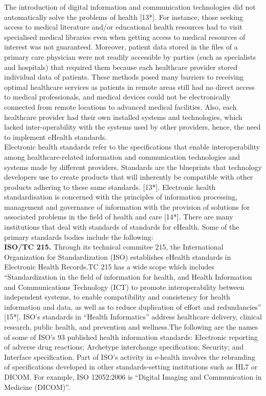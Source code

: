 \documentclass[a4paper]{article}
\begin{document}
The introduction of digital information and communication technologies did not automatically solve the problems of health [13*]. For instance, those seeking access to medical literature and/or educational health resources had to visit specialised medical libraries even when getting access to medical resources of interest was not guaranteed. Moreover, patient data stored in the files of a primary care physician were not readily accessible by parties (such as specialists and hospitals) that required them because each healthcare provider stored individual data of patients. These methods posed many barriers to receiving optimal healthcare services as patients in remote areas still had no direct access to medical professionals, and medical devices could not be electronically connected from remote locations to advanced medical facilities. Also, each healthcare provider had their own installed systems and technologies, which lacked inter-operability with the systems used by other providers, hence, the need to implement eHealth standards. \\Electronic health standards refer to the specifications that enable interoperability among healthcare-related information and communication technologies and systems made by different providers. Standards are the blueprints that technology developers use to create products that will inherently be compatible with other products adhering to these same standards.  [13*]. Electronic health standardisation is concerned with the principles of information processing, management and governance of information with the provision of solutions for associated problems in the field of health and care [14*]. There are many institutions that deal with standards of standards for eHealth. Some of the primary standards bodies include the following: \\
{\bf ISO/TC 215.} Through its technical commitee 215, the International Organization for Standardization (ISO) establishes eHealth standards in Electronic Health Records.TC 215 has a wide scope which includes “Standardization in the field
of information for health, and Health Information and Communications Technology (ICT) to promote interoperability
between independent systems, to enable compatibility and consistency for health information and data, as well as to reduce duplication of effort and redundancies” [15*]. ISO’s standards in
“Health Informatics” address healthcare delivery, clinical research, public health, and prevention and wellness.The following are the names of some of ISO’s 93 published health information standards: Electronic reporting of adverse drug reactions; Archetype interchange specification; Security; and Interface specification. Part of ISO’s activity in e-health involves the rebranding of specifications developed in other standards-setting institutions such as HL7 or DICOM. For example, ISO 12052:2006 is “Digital Imaging and Communication in Medicine (DICOM)”.\\
\end{document}

